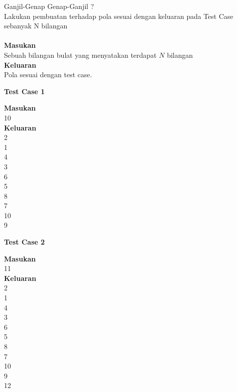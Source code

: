 \newpage
\begin{permasalahan}{Ganjil-Genap Genap-Ganjil ?}\\
\label{prob:GanjilGenap}
		Lakukan pembuatan terhadap pola sesuai dengan keluaran pada Test Case sebanyak N bilangan \\\\
	\textbf{Masukan}\\
	Sebuah bilangan bulat yang menyatakan terdapat $N$ bilangan\\
	\textbf{Keluaran}\\
	Pola sesuai dengan test case.
	\\
	\begin{center}
	\textbf{Test Case 1}\\
	\end{center}
	\textbf{Masukan}\\
	10\\
	\textbf{Keluaran}\\
2\\
1\\
4\\
3\\
6\\
5\\
8\\
7\\
10\\
9\\
	\begin{center}
	\textbf{Test Case 2}\\
	\end{center}
	\textbf{Masukan}\\
	11\\
	\textbf{Keluaran}\\
2\\
1\\
4\\
3\\
6\\
5\\
8\\
7\\
10\\
9\\
12\\
\end{permasalahan}






